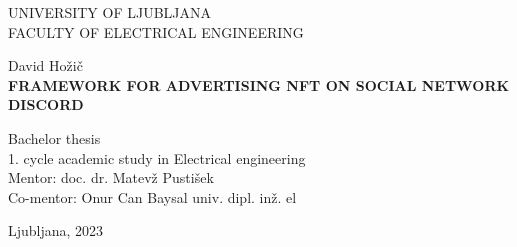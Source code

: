 \begin{titlepage}
    \thispagestyle{empty} 

        \begin{center}
        {\large 
        UNIVERSITY OF LJUBLJANA\\
        FACULTY OF ELECTRICAL ENGINEERING\\
        }

        \vspace{3cm}
        {\LARGE David Hožič}\\

        \vspace{2cm}
        {\textbf{\LARGE 
        FRAMEWORK FOR ADVERTISING NFT ON SOCIAL NETWORK DISCORD\\ 
        }}

        \vspace{2cm}
        {\Large Bachelor thesis}\\
        
        \vspace{1cm}
        {\Large 1. cycle academic study in Electrical engineering}\\

        \vspace{2cm}
        {\Large Mentor: doc. dr. Matevž Pustišek}\\
        {\Large Co-mentor: Onur Can Baysal univ. dipl. inž. el}

        \vfill
        {\Large Ljubljana, 2023}
        \end{center}
        \ \thispagestyle{empty}
\end{titlepage}

